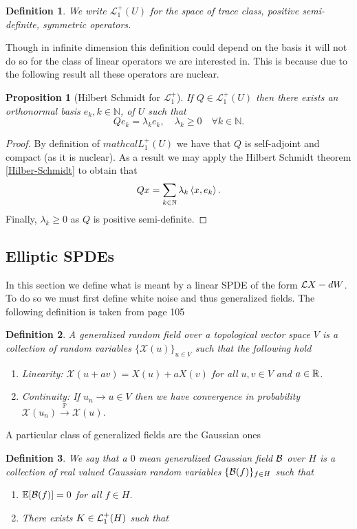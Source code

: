 \documentclass[12pt]{article}
\newtheorem{proposition}{Proposition}
\newtheorem{definition}{Definition}
\newcommand{\br}[1]{\left\langle#1\right\rangle}
\begin{document}
\begin{definition}
    We write $\mathcal{L}_1^+(U)$ for the space of trace class, positive semi-definite, symmetric operators.
\end{definition}
Though in infinite dimension this definition could depend on the basis it will not do so for the class of linear operators we are interested in. This is because due to the following result all these operators are nuclear.
\begin{proposition}[Hilbert Schmidt for $\mathcal{L}_1^+$]
    If $Q \in \mathcal{L}_1^+(U)$ then there exists an orthonormal basis $e_{k}, k \in \mathbb{N}$, of $U$ such that
    $$
        Q e_{k}=\lambda_{k} e_{k}, \quad \lambda_{k} \geq 0\quad \forall k \in \mathbb{N}.
    $$
\end{proposition}
\begin{proof}
    By definition of $mathcal{L}_1^+(U)$ we have that $Q$ is self-adjoint and compact (as it is nuclear).
    As a result we may apply the Hilbert Schmidt theorem \ref{Hilber-Schmidt} to obtain that
    \begin{equation*}
        Q x=\sum_{k\in\N}\lambda_{k} \br{x,e_{k}}.
    \end{equation*}
    Finally, $\lambda_k\geq 0$ as $Q$ is positive semi-definite.
\end{proof}
\subsection{Elliptic SPDEs}
In this section we define what is meant by a linear SPDE of the form $\mathcal{L} X-dW$. To do so we must first define white noise and thus generalized fields. The following definition is taken from \cite{lototsky2017stochastic} page 105
\begin{definition}
    A generalized random field over a topological vector space $V$ is a collection of random variables  $\{\mathcal{X}(u)\}_{u\in V}$ such that the following hold
    \begin{enumerate}
        \item \emph{Linearity}: $\mathcal{X}(u+av)=X(u)+aX(v)$ for all  $u,v\in V$ and $a\in {\mathbb R}$.
        \item \emph{Continuity}: If $u_n\to u\in V$ then we have convergence in probability $\mathcal{X}(u_n)\xrightarrow{\mathbb{P}}\mathcal{X}(u)$.
    \end{enumerate}
\end{definition}
A particular class of generalized fields are the Gaussian ones
\begin{definition}
    We say that a $0$ mean \emph{generalized Gaussian field} $\mathcal{B}$ over $H$ is a collection of real valued Gaussian random variables $\{\mathcal{B}(f)\}_{f\in H} $ such that
    \begin{enumerate}
        \item $\mathbb{E}[\mathcal{B}(f)]=0$ for all $f\in H$.
        \item There exists $K\in \mathcal{L}_1^+(H)$ such that
    \end{enumerate}
\end{definition}

\end{document}
